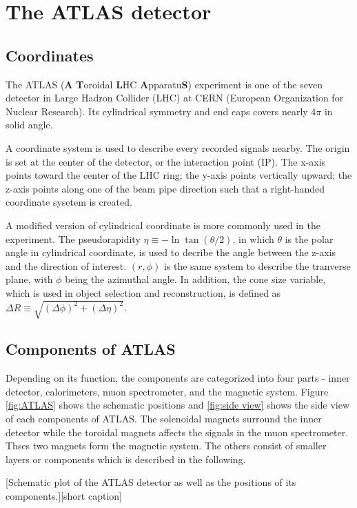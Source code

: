 \documentclass[class=NCU_thesis, crop=false]{standalone}
\begin{document}
\chapter{The ATLAS detector}
\section{Coordinates}
	The ATLAS (\textbf{A} \textbf{T}oroidal \textbf{L}HC \textbf{A}pparatu\textbf{S}) experiment is one of the seven detector in Large Hadron Collider (LHC) at CERN (European Organization for Nuclear Research). Its cylindrical symmetry and end caps covers nearly $4\pi$ in solid angle.
	
	A coordinate system is used to describe every recorded signals nearby. The origin is set at the center of the detector, or the interaction point (IP). The x-axis points toward the center of the LHC ring; the y-axis points vertically upward; the z-axis points along one of the beam pipe direction such that a right-handed coordinate sysetem is created.
	
	A modified version of cylindrical coordinate is more commonly used in the experiment. The pseudorapidity $\eta \equiv -\ln\tan(\theta / 2)$, in which $\theta$ is the polar angle in cylindrical coordinate, is used to decribe the angle between the z-axis and the direction of interest. $(r, \phi)$ is the same system to describe the tranverse plane, with $\phi$ being the azimuthal angle. In addition, the cone size variable, which is used in object selection and reconstruction, is defined as $\Delta R \equiv \sqrt{(\Delta \phi)^2 + (\Delta \eta)^2}$.

\section{Components of ATLAS}
	Depending on its function, the components are categorized into four parts - inner detector, calorimeters, muon spectrometer, and the magnetic system. Figure \ref{fig:ATLAS} shows the schematic positions and \ref{fig:side view} shows the side view of each components of ATLAS. The solenoidal magnets surround the inner detector while the toroidal magnets affects the signals in the muon spectrometer. Thses two magnets form the magnetic system. The others consist of smaller layers or components which is described in the following.
	
	[Schematic plot of the ATLAS detector as well as the positions of its components.][short caption]
	
\end{document}
